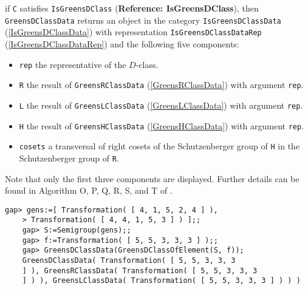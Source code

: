 \documentclass[a4paper,11pt]{report}
\begin{document}
{{{ if \texttt{C} satisfies \texttt{IsGreensDClass} (\textbf{Reference: IsGreensDClass}), then \texttt{GreensDClassData} returns an object in the category \texttt{IsGreensDClassData} (\ref{IsGreensDClassData}) with representation \texttt{IsGreensDClassDataRep} (\ref{IsGreensDClassDataRep}) and the following five components: 
\begin{itemize}
\item \texttt{rep} the representative of the $D$-class.
\item \texttt{R} the result of \texttt{GreensRClassData} (\ref{GreensRClassData}) with argument \texttt{rep}.
\item \texttt{L} the result of \texttt{GreensLClassData} (\ref{GreensLClassData}) with argument \texttt{rep}.
\item \texttt{H} the result of \texttt{GreensHClassData} (\ref{GreensHClassData}) with argument \texttt{rep}.
\item  \texttt{cosets} a transversal of right cosets of the Schutzenberger group of \texttt{H} in the Schutzenberger group of \texttt{R}.
\end{itemize}
 Note that only the first three components are displayed. Further details can
be found in Algorithm O, P, Q, R, S, and T of \cite{pfeiffer2}. 
\begin{Verbatim}[fontsize=\small,frame=single,label=Example]
    gap> gens:=[ Transformation( [ 4, 1, 5, 2, 4 ] ), 
    > Transformation( [ 4, 4, 1, 5, 3 ] ) ];;
    gap> S:=Semigroup(gens);;
    gap> f:=Transformation( [ 5, 5, 3, 3, 3 ] );;
    gap> GreensDClassData(GreensDClassOfElement(S, f));
    GreensDClassData( Transformation( [ 5, 5, 3, 3, 3 
    ] ), GreensRClassData( Transformation( [ 5, 5, 3, 3, 3 
    ] ) ), GreensLClassData( Transformation( [ 5, 5, 3, 3, 3 ] ) ) )
\end{Verbatim}
  }

 
}}
\end{document}
